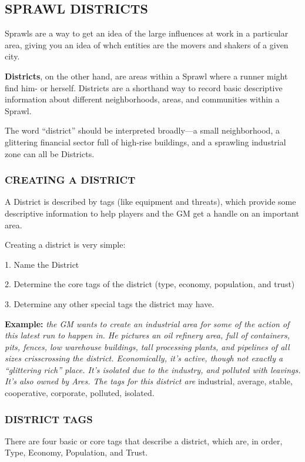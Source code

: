 \documentclass[oneside,10pt]{article}
\begin{document}
\begin{multicols}{2}
\subsection{SPRAWL DISTRICTS}
Sprawls are a way to get an idea of the large influences at
work in a particular area, giving you an idea of whch entities
are the movers and shakers of a given city.

\textbf{Districts}, on the other hand, are areas within a Sprawl where
a runner might find him- or herself. Districts are a shorthand
way to record basic descriptive information about different
neighborhoods, areas, and communities within a Sprawl.

The word “district” should be interpreted broadly—a small
neighborhood, a glittering financial sector full of high-rise
buildings, and a sprawling industrial zone can all be Districts.

\subsubsection{CREATING A DISTRICT}
A District is described by tags (like equipment and threats),
which provide some descriptive information to help players
and the GM get a handle on an important area.

Creating a district is very simple:
\begin{adjustwidth*}{.5cm}{.5cm}

1.	Name the District

2.	Determine the core tags of the district (type, economy,
population, and trust)

3.	Determine any other special tags the district may have.

\textbf{Example:} \textit{the GM wants to create an industrial area for
some of the action of this latest run to happen in. He pictures an oil refinery area, full of containers, pits, fences, low
warehouse buildings, tall processing plants, and pipelines
of all sizes crisscrossing the district. Economically, it’s active, though not exactly a “glittering rich” place. It’s isolated due to the industry, and polluted with leavings. It’s
also owned by Ares. The tags for this district are} industrial,
average, stable, cooperative, corporate, polluted, isolated.
\end{adjustwidth*}
\subsubsection{DISTRICT TAGS}
There are four basic or core tags that describe a district, which
are, in order, Type, Economy, Population, and Trust.


\end{multicols}
\end{document}

